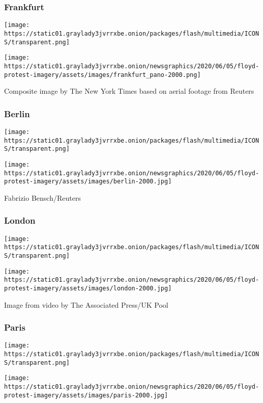 \hypertarget{frankfurt}{%
\subsubsection{Frankfurt}\label{frankfurt}}

\texttt{[image: https://static01.graylady3jvrrxbe.onion/packages/flash/multimedia/ICONS/transparent.png]}

\texttt{[image: https://static01.graylady3jvrrxbe.onion/newsgraphics/2020/06/05/floyd-protest-imagery/assets/images/frankfurt\_pano-2000.png]}

Composite image by The New York Times based on aerial footage from
Reuters

\hypertarget{berlin}{%
\subsubsection{Berlin}\label{berlin}}

\texttt{[image: https://static01.graylady3jvrrxbe.onion/packages/flash/multimedia/ICONS/transparent.png]}

\texttt{[image: https://static01.graylady3jvrrxbe.onion/newsgraphics/2020/06/05/floyd-protest-imagery/assets/images/berlin-2000.jpg]}

Fabrizio Bensch/Reuters

\hypertarget{london}{%
\subsubsection{London}\label{london}}

\texttt{[image: https://static01.graylady3jvrrxbe.onion/packages/flash/multimedia/ICONS/transparent.png]}

\texttt{[image: https://static01.graylady3jvrrxbe.onion/newsgraphics/2020/06/05/floyd-protest-imagery/assets/images/london-2000.jpg]}

Image from video by The Associated Press/UK Pool

\hypertarget{paris}{%
\subsubsection{Paris}\label{paris}}

\texttt{[image: https://static01.graylady3jvrrxbe.onion/packages/flash/multimedia/ICONS/transparent.png]}

\texttt{[image: https://static01.graylady3jvrrxbe.onion/newsgraphics/2020/06/05/floyd-protest-imagery/assets/images/paris-2000.jpg]}

